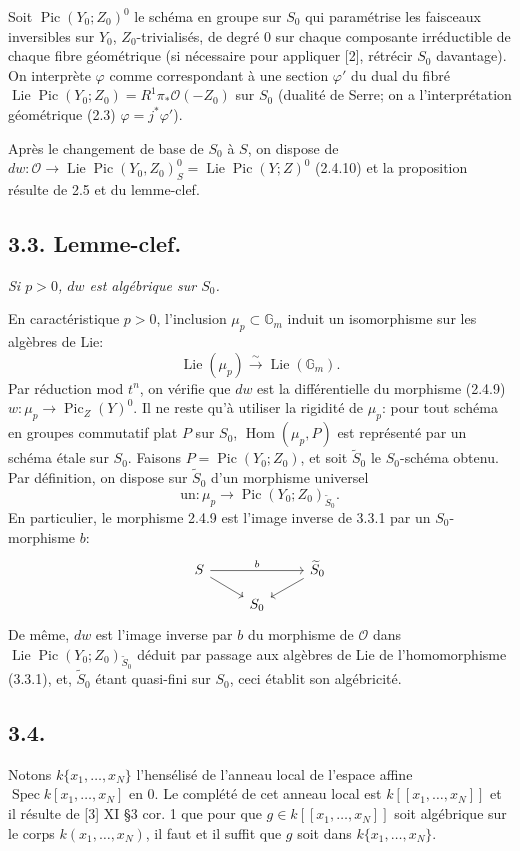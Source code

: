 \documentclass[11pt]{article}
\DeclareMathOperator{\Spec}{Spec}
\DeclareMathOperator{\Lie}{Lie}
\DeclareMathOperator{\Pic}{Pic}
\DeclareMathOperator{\Hom}{Hom}
\newcommand{\OO}{\mathcal O}
\newcommand{\GG}{\mathbb G}
\begin{document}
Soit $\Pic(Y_0;Z_0)^0$ le schéma en groupe sur $S_0$ qui paramétrise les faisceaux inversibles sur $Y_0$, $Z_0$-trivialisés, de degré 0 sur chaque composante irréductible de chaque fibre géométrique (si nécessaire pour appliquer [2], rétrécir $S_0$ davantage). On interprète $\varphi$ comme correspondant à une section $\varphi'$ du dual du fibré $\Lie\Pic(Y_0;Z_0)=R^1\pi_*\OO(-Z_0)$ sur $S_0$ (dualité de Serre; on a l'interprétation géométrique (2.3) $\varphi=j^*\varphi'$).

Après le changement de base de $S_0$ à $S$, on dispose de $dw:\OO\to\Lie\Pic(Y_0,Z_0)^0_S=\Lie\Pic(Y;Z)^0$ (2.4.10) et la proposition résulte de 2.5 et du lemme-clef.

\subsection*{3.3. Lemme-clef.}
\emph{Si $p>0$, $dw$ est algébrique sur $S_0$.}

En caractéristique $p>0$, l'inclusion $\mu_p\subset\GG_m$ induit un isomorphisme sur les algèbres de Lie:
\[
        \Lie(\mu_p)\xrightarrow{\sim}\Lie(\GG_m).
\]
Par réduction mod $t^n$, on vérifie que $dw$ est la différentielle du morphisme (2.4.9) $w:\mu_p\to\Pic_Z(Y)^0$. Il ne reste qu'à utiliser la rigidité de $\mu_p$: pour tout schéma en groupes commutatif plat $P$ sur $S_0$, $\Hom(\mu_p,P)$ est représenté par un schéma étale sur $S_0$. Faisons $P=\Pic(Y_0;Z_0)$, et soit $\widetilde S_0$ le $S_0$-schéma obtenu. Par définition, on dispose sur $\widetilde S_0$ d'un morphisme universel
\begin{equation}
        \mathrm{un}:\mu_p\longrightarrow\Pic(Y_0;Z_0)_{\widetilde S_0}. \tag{3.3.1}
\end{equation}
En particulier, le morphisme 2.4.9 est l'image inverse de 3.3.1 par un $S_0$-morphisme $b$:
\[
\begin{tikzcd}[row sep=small]
S \arrow[rr,"b"] \arrow[dr] & & \widetilde S_0 \arrow[dl] \\
& S_0 &
\end{tikzcd}
\]
De même, $dw$ est l'image inverse par $b$ du morphisme de $\OO$ dans $\Lie\Pic(Y_0;Z_0)_{\widetilde S_0}$ déduit par passage aux algèbres de Lie de l'homomorphisme (3.3.1), et, $\widetilde S_0$ étant quasi-fini sur $S_0$, ceci établit son algébricité.

\subsection*{3.4.}
Notons $k\{x_1,\ldots,x_N\}$ l'hensélisé de l'anneau local de l'espace affine $\Spec k[x_1,\ldots,x_N]$ en $0$. Le complété de cet anneau local est $k[[x_1,\ldots,x_N]]$ et il résulte de [3] XI §3 cor. 1 que pour que $g\in k[[x_1,\ldots,x_N]]$ soit algébrique sur le corps $k(x_1,\ldots,x_N)$, il faut et il suffit que $g$ soit dans $k\{x_1,\ldots,x_N\}$.
\end{document}
